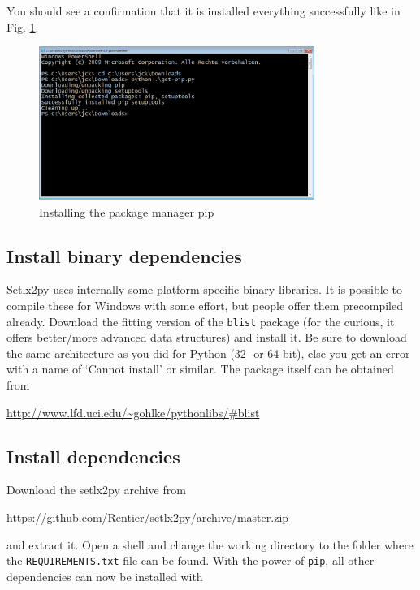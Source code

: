 You should see a confirmation that it is installed everything successfully like in Fig. \ref{fig:install-pip}.

\begin{figure}[ht]
    \centering
    \includegraphics[width=0.8\textwidth]{img/install-pip.png}    
    \caption{Installing the package manager pip}
    \label{fig:install-pip}    
\end{figure}

\subsection{Install binary dependencies}

Setlx2py uses internally some platform-specific binary libraries. It is possible to compile these for Windows with some effort, but people offer them precompiled already. Download the fitting version of the \texttt{blist} package (for the curious, it offers better/more advanced data structures) and install it. Be sure to download the same architecture as you did for Python (32- or 64-bit), else you get an error with a name of `Cannot install' or similar. The package itself can be obtained from

\url{http://www.lfd.uci.edu/~gohlke/pythonlibs/#blist}

\subsection{Install dependencies}

Download the setlx2py archive from 

\url{https://github.com/Rentier/setlx2py/archive/master.zip}

and extract it. Open a shell and change the working directory to the folder where the \texttt{REQUIREMENTS.txt} file can be found. With the power of \texttt{pip}, all other dependencies can now be installed with 

